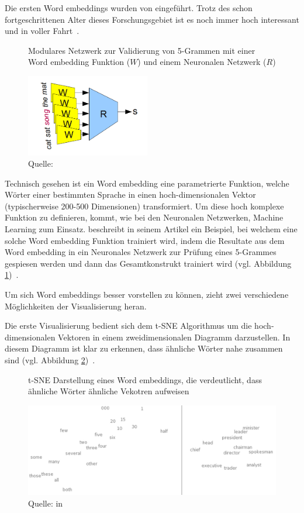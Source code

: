 Die ersten Word embeddings wurden von \textcite{Bengio2001} eingeführt. Trotz des schon fortgeschrittenen Alter dieses Forschungsgebiet ist es noch immer hoch interessant und in voller Fahrt~\autocite{Olah2014b}.

\begin{figure} 
    \caption{Modulares Netzwerk zur Validierung von 5-Grammen mit einer Word embedding Funktion ($W$) und einem Neuronalen Netzwerk ($R$)}
    \label{wordembeddingtraining}
    \centering
    \includegraphics[width=0.48\textwidth]{graphics/wordembeddingtraining.png}
    \caption*{Quelle: \textcite{Olah2014b}}
\end{figure}
Technisch gesehen ist ein Word embedding eine parametrierte Funktion, welche Wörter einer bestimmten Sprache in einen hoch-dimensionalen Vektor (typischerweise 200-500 Dimensionen) transformiert. Um diese hoch komplexe Funktion zu definieren, kommt, wie bei den Neuronalen Netzwerken, Machine Learning zum Einsatz. \textcite{Olah2014b} beschreibt in seinem Artikel ein Beispiel, bei welchem eine solche Word embedding Funktion trainiert wird, indem die Resultate aus dem Word embedding in ein Neuronales Netzwerk zur Prüfung eines 5-Grammes gespiesen werden und dann das Gesamtkonstrukt trainiert wird (vgl. Abbildung \ref{wordembeddingtraining})~\autocite{Olah2014b}.

Um sich Word embeddings besser vorstellen zu können, zieht \textcite{Olah2014b} zwei verschiedene Möglichkeiten der Visualisierung heran.

Die erste Visualisierung bedient sich dem t-SNE Algorithmus um die hoch-dimensionalen Vektoren in einem zweidimensionalen Diagramm darzustellen. In diesem Diagramm ist klar zu erkennen, dass ähnliche Wörter nahe zusammen sind (vgl. Abbildung \ref{wordembeddingtsne})~\autocite{Olah2014b}.
\begin{figure}[h]
    \centering
    \caption{t-SNE Darstellung eines Word embeddings, die verdeutlicht, dass ähnliche Wörter ähnliche Vekotren aufweisen}
    \includegraphics[width=\textwidth]{graphics/wordmebeddingtsne.jpg}
    \caption*{Quelle: \textcite{Turian2010} in \textcite{Olah2014b}}
    \label{wordembeddingtsne}
\end{figure}

